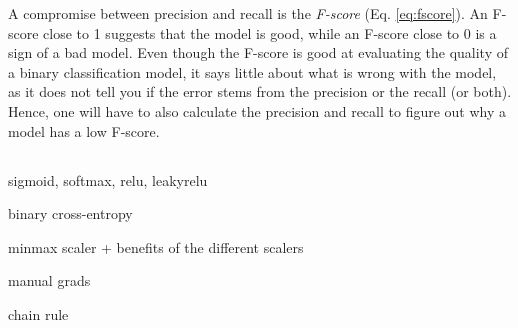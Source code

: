A compromise between precision and recall is the \textit{F-score} (Eq. \ref{eq:fscore}).
An F-score close to 1 suggests that the model is good, while an F-score close to 0 is a sign of a bad model.
Even though the F-score is good at evaluating the quality of a binary classification model, it says little about what is wrong with the model, as it does not tell you if the error stems from the precision or the recall (or both).
Hence, one will have to also calculate the precision and recall to figure out why a model has a low F-score.

\subsection{}

sigmoid, softmax, relu, leakyrelu

binary cross-entropy 

minmax scaler + benefits of the different scalers 


manual grads

chain rule 

